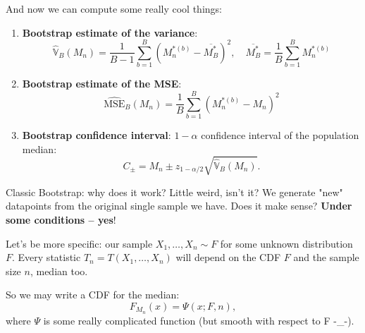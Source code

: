 \documentclass{beamer}          %
\begin{document}
\begin{frame}
  And now we can compute some really cool things:
  \begin{enumerate}
    \item \textbf{Bootstrap estimate of the variance}:
      \begin{equation*}
        \widehat{\mathbb{V}}_B(M_n) = \frac{1}{B - 1}\sum_{b=1}^{B}(M_n^{*(b)} - \overline{M_B^*})^2, \quad \overline{M_B^*} = \frac{1}{B}\sum_{b=1}^{B}M_n^{*(b)}
      \end{equation*}
    \item \textbf{Bootstrap estimate of the MSE}:
      \begin{equation*}
        \widehat{\text{MSE}}_B(M_n) = \frac{1}{B}\sum_{b=1}^{B}(M_n^{*(b)} - M_n)^2
      \end{equation*}
    \item \textbf{Bootstrap confidence interval}: $1 - \alpha$ confidence interval of the population median:
      \begin{equation*}
        C_\pm = M_n \pm z_{1 - \alpha/2}\sqrt{\widehat{\mathbb{V}}_B(M_n)}.
      \end{equation*}
  \end{enumerate}
\end{frame}

\begin{frame}{Classic Bootstrap: why does it work?}
  Little weird, isn't it? We generate "new" datapoints from the original single sample we have. Does it make sense? \textbf{Under some conditions -- yes}! \\

  \vspace{1em}

  Let's be more specific: our sample $X_1, \hdots, X_n \sim F$ for some unknown distribution $F$. Every statistic $T_n = T(X_1, \hdots, X_n)$ will depend on the CDF $F$ and the sample size $n$, median too. \\

  \vspace{1em}

  So we may write a CDF for the median:
  \begin{equation}
    F_{M_n}(x) = \Psi(x; F, n),
    \label{approxmed}
  \end{equation}
  where $\Psi$ is some really complicated function (but smooth with respect to F -\_-). \\

\end{frame}
\end{document}
